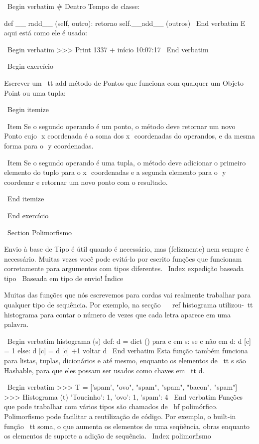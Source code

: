 \documentclass[10pt]{book}
\begin{document}
{{{{{{{{{{{{{{\ Begin {verbatim}
# Dentro Tempo de classe:

    def __ radd__ (self, outro):
        retorno self.__add__ (outros)
\ End {verbatim}
%
E aqui está como ele é usado:

\ Begin {verbatim}
>>> Print 1337 + início
10:07:17
\ End {verbatim}
%

\ Begin {} exercício

Escrever um {\ tt add} método de Pontos que funciona com qualquer um
Objeto Point ou uma tupla:  

\ Begin {itemize}

\ Item Se o segundo operando é um ponto, o método deve retornar um novo
Ponto cujo $ $ x coordenada é a soma dos x $ $ coordenadas do
operandos, e da mesma forma para o $ $ y coordenadas.

\ Item Se o segundo operando é uma tupla, o método deve adicionar o
primeiro elemento do tuplo para o x $ $ coordenadas e a segunda
elemento para o $ $ y coordenar e retornar um novo ponto com o resultado. 

\ End {itemize}

\ End {} exercício

\ Section {} Polimorfismo

Envio à base de Tipo é útil quando é necessário, mas (felizmente)
nem sempre é necessário. Muitas vezes você pode evitá-lo por escrito funções
que funcionam corretamente para argumentos com tipos diferentes.
\ Index {expedição baseada tipo}
\ {Baseada em tipo de envio!} Índice

Muitas das funções que nós escrevemos para cordas vai realmente
trabalhar para qualquer tipo de sequência.
Por exemplo, na secção ~ \ ref {histograma}
utilizou-{\ tt histograma} para contar o número de vezes que cada letra
aparece em uma palavra.

\ Begin {verbatim}
histograma (s) def:
    d = dict ()
    para c em s:
        se c não em d:
            d [c] = 1
        else:
            d [c] = d [c] +1
    voltar d
\ End {verbatim}
%
Esta função também funciona para listas, tuplas, dicionários e até mesmo,
enquanto os elementos de {\ tt s} são Hashable, para que eles possam ser usados
como chaves em {\ tt d}.

\ Begin {verbatim}
>>> T = ['spam', "ovo", "spam", "spam", "bacon", "spam"]
>>> Histograma (t)
{'Toucinho': 1, 'ovo': 1, 'spam': 4}
\ End {verbatim}
%
Funções que pode trabalhar com vários tipos são chamados de {\ bf polimórfico}.
Polimorfismo pode facilitar a reutilização de código. Por exemplo, o built-in
função {\ tt soma}, o que aumenta os elementos de uma seqüência, obras
enquanto os elementos de suporte a adição de sequência.
\ Index {polimorfismo}

}}}}}}}}}}}}}}
\end{document}

